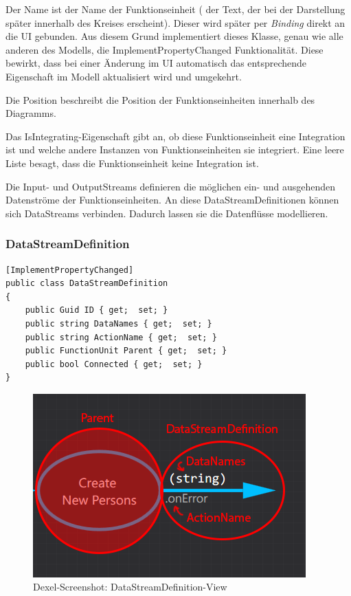 Der Name ist der Name der Funktionseinheit ( der Text, der bei der
Darstellung später innerhalb des Kreises erscheint). Dieser wird später per \textit{Binding}
direkt an die UI gebunden. Aus diesem Grund implementiert dieses Klasse,
genau wie alle anderen des Modells, die ImplementPropertyChanged
Funktionalität. Diese bewirkt, dass bei einer Änderung im UI automatisch das
entsprechende Eigenschaft im Modell aktualisiert wird und umgekehrt.

Die Position beschreibt die Position der Funktionseinheiten innerhalb des
Diagramms.  

Das IsIntegrating-Eigenschaft gibt an, ob diese Funktionseinheit eine Integration
ist und welche andere Instanzen von Funktionseinheiten sie integriert.
Eine leere Liste besagt, dass die Funktionseinheit keine Integration ist.

Die Input- und OutputStreams definieren die möglichen ein- und ausgehenden
Datenströme der Funktionseinheiten. An diese DataStreamDefinitionen können sich DataStreams
verbinden. Dadurch lassen sie die Datenflüsse modellieren.


	\subsubsection{DataStreamDefinition}
	
	\begin{lstlisting}[caption=DataStreamDefinition Klasse]
[ImplementPropertyChanged]
public class DataStreamDefinition
{
	public Guid ID { get;  set; }
	public string DataNames { get;  set; }
	public string ActionName { get;  set; }
	public FunctionUnit Parent { get;  set; }
	public bool Connected { get;  set; }
}
	\end{lstlisting}
	
		
		\begin{figure}[H]
			\centering
			\includegraphics[width=0.6\linewidth]{./img/DataStreamDefinitionView.png} 
			\caption{Dexel-Screenshot: DataStreamDefinition-View}
		\end{figure}
	
